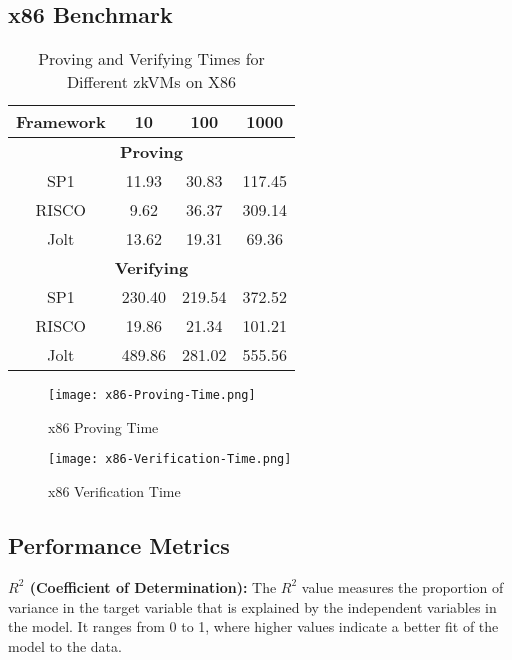 \documentclass{scrartcl}
\begin{document}
\subsection{x86 Benchmark}
\begin{table}[h!]
	\centering
	\caption{Proving and Verifying Times for Different zkVMs on X86}
	\begin{tabular}{|c|c|c|c|}
	\hline
	\textbf{Framework} & \textbf{10} & \textbf{100} & \textbf{1000} \\ \hline
	\multicolumn{4}{|c|}{\textbf{Proving}} \\ \hline
	SP1 & 11.93 & 30.83 & 117.45 \\ \hline
	RISCO & 9.62 & 36.37 & 309.14 \\ \hline
	Jolt & 13.62 & 19.31 & 69.36 \\ \hline
	\multicolumn{4}{|c|}{\textbf{Verifying}} \\ \hline
	SP1 & 230.40 & 219.54 & 372.52 \\ \hline
	RISCO & 19.86 & 21.34 & 101.21 \\ \hline
	Jolt & 489.86 & 281.02 & 555.56 \\ \hline
	\end{tabular}
	\label{tab:proving-verifying-times}
	\end{table}
	

\begin{figure}
	\begin{center}
		\texttt{[image: x86-Proving-Time.png]}
	\end{center}
	\caption{x86 Proving Time}
	\label{graph:x86-proving-time}
\end{figure}

\begin{figure}
	\begin{center}
		\texttt{[image: x86-Verification-Time.png]}
	\end{center}
	\caption{x86 Verification Time}
	\label{graph:x86-verification-time}
\end{figure}

\subsection{Performance Metrics}
\textbf{\(R^2\) (Coefficient of Determination):} 
The \(R^2\) value measures the proportion of variance in the target variable that is explained by the independent variables in the model. It ranges from 0 to 1, where higher values indicate a better fit of the model to the data.
\end{document}
